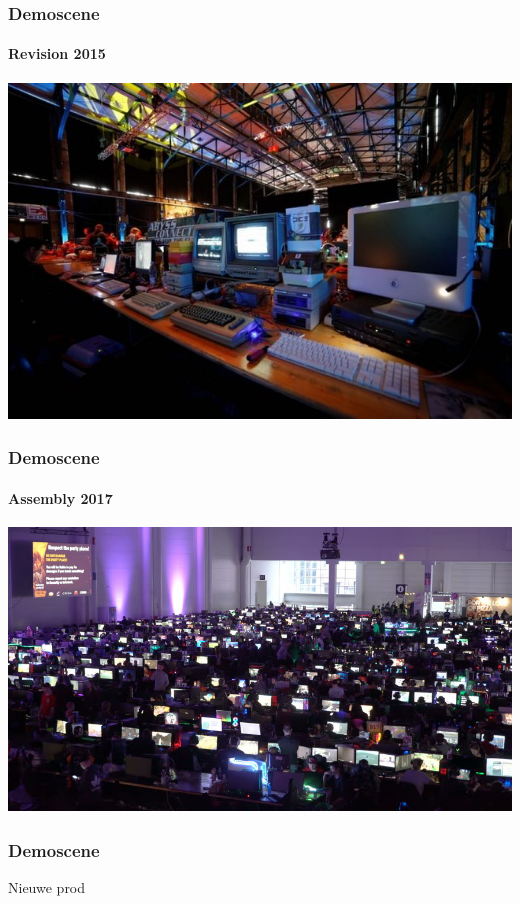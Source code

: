 \documentclass{beamer}
\begin{document}
\begin{frame}
	\frametitle{Demoscene}
	\framesubtitle{Revision 2015}

	\begin{center}
	\includegraphics[width=\textwidth]{revision2015.jpeg}
	\end{center}
\end{frame}

\begin{frame}
	\frametitle{Demoscene}
	\framesubtitle{Assembly 2017}

	\begin{center}
	\includegraphics[width=\textwidth]{assembly2017.jpg}
	\end{center}
\end{frame}

\begin{frame}
	\frametitle{Demoscene}

	Nieuwe prod
\end{frame}

\end{document}
